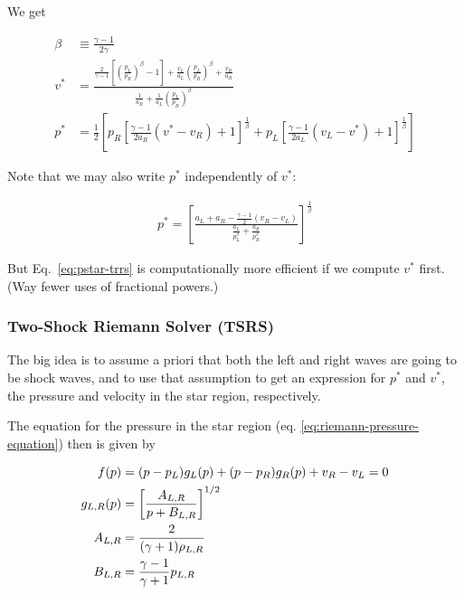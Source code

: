 We get

\begin{align}
\beta &\equiv
	\frac{\gamma - 1}{2 \gamma} \\
v^* &=
	\frac{
		\frac{2}{\gamma - 1}
		\left[
			\left(\frac{p_L}{p_R} \right) ^ \beta - 1
		\right] +
		\frac{v_L}{a_L}
		\left(
			\frac{p_L}{p_R}
		\right) ^ \beta  + \frac{v_R}{a_R}
	}{
		\frac{1}{a_R} +
		\frac{1}{a_L}\left(\frac{p_L}{p_R} \right) ^ \beta
	} \\
p^* &=
	\frac{1}{2}
	\left[
		p_R
		\left[
			\frac{\gamma - 1}{2 a_R} (v^* - v_R) + 1
		\right] ^ \frac{1}{\beta} + p_L
		\left[
			\frac{\gamma - 1}{2 a_L} (v_L - v^*) + 1
		\right] ^ \frac{1}{\beta}
	\right] \label{eq:pstar-trrs}
\end{align}

Note that we may also write $p^*$ independently of $v^*$:

\begin{align}
p^* =
	\left[
		\frac{
			a_L + a_R - \frac{\gamma - 1}{2} (v_R - v_L)
		}{
			\frac{a_L}{p_L^\beta} +		\frac{a_R}{p_R^\beta}
		}
	\right] ^ \frac{1}{\beta}
\end{align}

But Eq.~\ref{eq:pstar-trrs} is computationally more efficient if we compute
$v^*$ first. (Way fewer uses of fractional powers.)















\subsubsection{Two-Shock Riemann Solver (TSRS)}\label{chap:riemann-tsrs}


The big idea is to assume a priori that both the left and right waves are
going to be shock waves, and to use that assumption to get an expression for
$p^*$ and $v^*$, the pressure and velocity in the star region, respectively.


The equation for the pressure in the star region (eq.
\ref{eq:riemann-pressure-equation}) then is given by

\begin{align}
f(p) &=
	(p - p_L) g_L(p) + (p - p_R) g_R(p) + v_R - v_L = 0
	\label{eq:riemann-pressure-tsrs} \\
%
g_{L,R}(p) &=
	\left[
		\frac{A_{L,R}}{p + B_{L,R}}
	\right] ^{\half} \\
%
A_{L,R} &=
	\frac{2}{(\gamma + 1) \rho_{L,R}}\\
B_{L,R} &=
	\frac{\gamma - 1}{\gamma + 1} p_{L,R}
\end{align}

